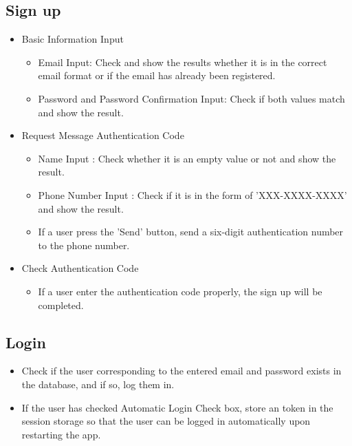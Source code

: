 \documentclass[conference]{IEEEtran}
\begin{document}
\subsection{Sign up}
\begin{itemize}
\item{Basic Information Input}
    \begin{itemize}
        \item Email Input: Check and show the results whether it is in the correct email format or if the email has already been registered.
        \item Password and Password Confirmation Input: Check if both values match and show the result.
    \end{itemize}
\end{itemize}
\begin{itemize}
    \item{Request Message Authentication Code}
    \begin{itemize}
        \item Name Input : Check whether it is an empty value or not and show the result.
        \item Phone Number Input :  Check if it is in the form of 'XXX-XXXX-XXXX' and show the result.
        \item If a user press the 'Send' button, send a six-digit authentication number to the phone number.
    \end{itemize}
\end{itemize}
\begin{itemize}
    \item{Check Authentication Code}
    \begin{itemize}
        \item If a user enter the authentication code properly, the sign up will be completed.\\
    \end{itemize}
\end{itemize}

\subsection{Login}
\begin{itemize}
    \item Check if the user corresponding to the entered email and password exists in the database, and if so, log them in.
    \item If the user has checked Automatic Login Check box, store an token in the session storage so that the user can be logged in automatically upon restarting the app.\\
\end{itemize}
\end{document}

